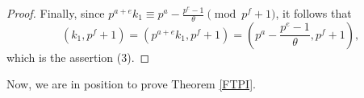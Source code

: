 \documentclass[a4paper,twopage,reqno,12pt]{amsart}
\theoremstyle{definition}
\numberwithin{equation}{section}
\begin{document}
\begin{proof}
Finally, since $p^{a+e}k_{1} \equiv p^{a}-\frac{p^{e}-1}{\theta } \pmod{p^{f}+1}$, it follows that
\begin{equation*}
\left( k_{1},p^{f}+1\right)=\left( p^{a+e}k_{1},p^{f}+1\right)=\left( p^{a}-\frac{p^{e}-1}{\theta },p^{f}+1\right)\text{,}
\end{equation*}
which is the assertion (3).
\end{proof}

\bigskip

Now, we are in position to prove Theorem \ref{FTPI}.


\bigskip
\end{document}
